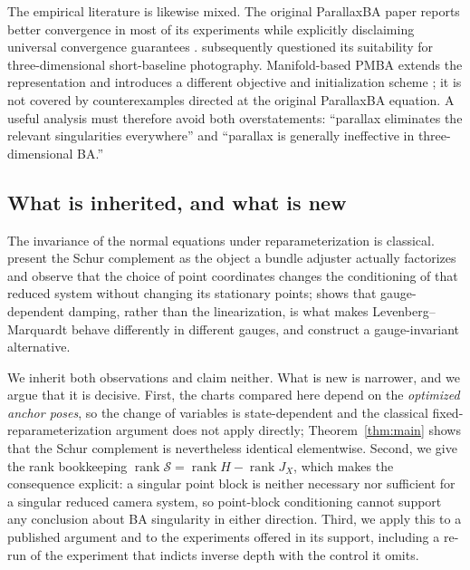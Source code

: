 \documentclass[11pt,a4paper]{article}
\let\cite\citep
\theoremstyle{definition}
\theoremstyle{remark}
\DeclareMathOperator{\rank}{rank}
\begin{document}
The empirical literature is likewise mixed. The original ParallaxBA paper reports better convergence in most of its experiments while explicitly disclaiming universal convergence guarantees \cite{zhao2015parallaxba}. \citet{zuo2023applicability} subsequently questioned its suitability for three-dimensional short-baseline photography. Manifold-based PMBA extends the representation and introduces a different objective and initialization scheme \cite{liu2018pmba}; it is not covered by counterexamples directed at the original ParallaxBA equation. A useful analysis must therefore avoid both overstatements: ``parallax eliminates the relevant singularities everywhere'' and ``parallax is generally ineffective in three-dimensional BA.''

\subsection{What is inherited, and what is new}
The invariance of the normal equations under reparameterization is classical. \citet{triggs1999bundle} present the Schur complement as the object a bundle adjuster actually factorizes and observe that the choice of point coordinates changes the conditioning of that reduced system without changing its stationary points; \citet{bartoli2003gauge} shows that gauge-dependent damping, rather than the linearization, is what makes Levenberg--Marquardt behave differently in different gauges, and construct a gauge-invariant alternative.

We inherit both observations and claim neither. What is new is narrower, and we argue that it is decisive. First, the charts compared here depend on the \emph{optimized anchor poses}, so the change of variables is state-dependent and the classical fixed-reparameterization argument does not apply directly; Theorem~\ref{thm:main} shows that the Schur complement is nevertheless identical elementwise. Second, we give the rank bookkeeping $\rank\mathcal S=\rank H-\rank J_X$, which makes the consequence explicit: a singular point block is neither necessary nor sufficient for a singular reduced camera system, so point-block conditioning cannot support any conclusion about BA singularity in either direction. Third, we apply this to a published argument and to the experiments offered in its support, including a re-run of the experiment that indicts inverse depth with the control it omits.
\end{document}
